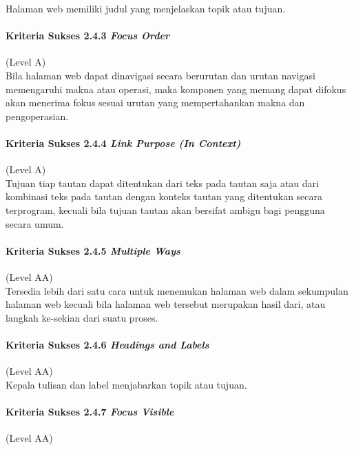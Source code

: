 Halaman web memiliki judul yang menjelaskan topik atau tujuan.

\paragraph{Kriteria Sukses 2.4.3 \textit{Focus Order}}
\label{sec:kriteria_sukses_2.4.3}
(Level A)\\

Bila halaman web dapat dinavigasi secara berurutan dan urutan navigasi memengaruhi makna atau operasi, maka komponen yang memang dapat difokus akan menerima fokus sesuai urutan yang mempertahankan makna dan pengoperasian.

\paragraph{Kriteria Sukses 2.4.4 \textit{Link Purpose (In Context)}}
\label{sec:kriteria_sukses_2.4.4}
(Level A)\\

Tujuan tiap tautan dapat ditentukan dari teks pada tautan saja atau dari kombinasi teks pada tautan dengan konteks tautan yang ditentukan secara terprogram, kecuali bila tujuan tautan akan bersifat ambigu bagi pengguna secara umum.

\paragraph{Kriteria Sukses 2.4.5 \textit{Multiple Ways}}
\label{sec:kriteria_sukses_2.4.5}
(Level AA)\\

Tersedia lebih dari satu cara untuk menemukan halaman web dalam sekumpulan halaman web kecuali bila halaman web tersebut merupakan hasil dari, atau langkah ke-sekian dari suatu proses.

\paragraph{Kriteria Sukses 2.4.6 \textit{Headings and Labels}}
\label{sec:kriteria_sukses_2.4.6}
(Level AA)\\
Kepala tulisan dan label menjabarkan topik atau tujuan.

\paragraph{Kriteria Sukses 2.4.7 \textit{Focus Visible}}
\label{sec:kriteria_sukses_2.4.7}
(Level AA)\\

